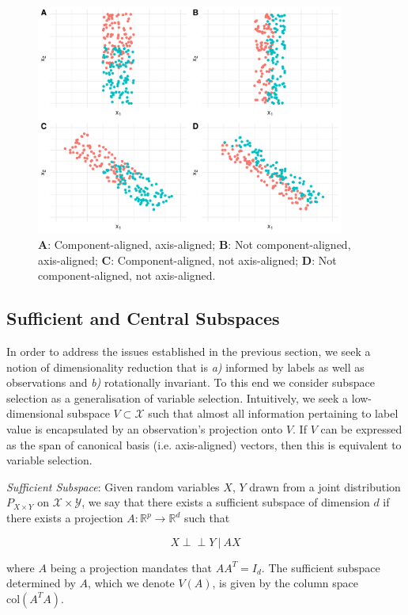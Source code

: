 \documentclass[12pt]{article}
\newenvironment{definition}[1][Definition]{\begin{trivlist}
\item[\hskip \labelsep {\bfseries #1}]}{\end{trivlist}}
\begin{document}
\begin{figure}[htbp]
    \centering
    \includegraphics[width=4in]{../results/figures/ExampleFigures.png}
    \caption{\textbf{A}: Component-aligned, axis-aligned; \textbf{B}: Not component-aligned, axis-aligned; \textbf{C}: Component-aligned, not axis-aligned; \textbf{D}: Not component-aligned, not axis-aligned.\label{fig:examplefigures}}
\end{figure}

\subsection{Sufficient  and Central Subspaces}
In order to address the issues established in the previous section, we seek a notion of dimensionality reduction that is \textit{a)} informed by labels as well as observations and \textit{b)} rotationally invariant. To this end we consider subspace selection as a generalisation of variable selection. Intuitively, we seek a low-dimensional subspace $V \subset \mathcal{X}$ such that almost all information pertaining to label value is encapsulated by an observation's projection onto $V$. If $V$ can be expressed as the span of canonical basis (i.e. axis-aligned) vectors, then this is equivalent to variable selection. 

\begin{definition}
    \textit{Sufficient Subspace}: Given random variables $X$, $Y$ drawn from a joint distribution $P_{X\times Y}$ on $\mathcal{X} \times \mathcal{Y}$, we say that there exists a sufficient subspace of dimension $d$ if there exists a projection $A : \mathbb{R}^p \rightarrow \mathbb{R}^d $ such that 
    
    \[
    X \perp\!\!\!\perp Y\ | \ AX
    \]
    
    where $A$ being a projection mandates that $A {A}^T = I_d$. The sufficient subspace determined by $A$, which we denote $V(A)$, is given by the column space $\text{col}(A^TA)$.
\end{definition}
\end{document}
